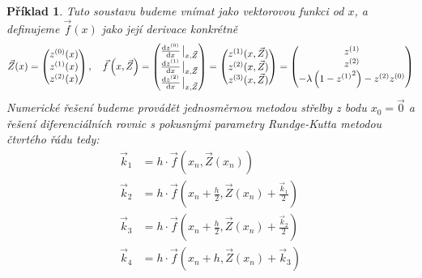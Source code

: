 \documentclass{article}
\newtheorem{example}{Příklad}
\begin{document}
\begin{example}
    Tuto soustavu budeme vnímat jako vektorovou funkci od $x$, a definujeme $\vec{f}(x)$ jako její derivace konkrétně 
    \begin{equation}
        \vec{Z}(x) = 
            \begin{pmatrix}
                z^{(0)}(x) \\ 
                z^{(1)}(x) \\
                z^{(2)}(x) \\
            \end{pmatrix} \qcomma 
        \vec{f}\left(x,\vec{Z}\right) = 
            \begin{pmatrix}
                \dv{z^{(0)}}{x}\eval_{x,\vec{Z}}\\
                \dv{z^{(1)}}{x}\eval_{x,\vec{Z}}\\
                \dv{z^{(2)}}{x}\eval_{x,\vec{Z}}\\
            \end{pmatrix}  =
            \begin{pmatrix} 
                z^{(1)}(x,\vec{Z}) \\
                z^{(2)}(x,\vec{Z}) \\
                z^{(3)}(x,\vec{Z}) \\
            \end{pmatrix} = 
            \begin{pmatrix} 
                z^{(1)} \\
                z^{(2)} \\
                -\lambda \left( 1 - {z^{(1)}}^{2} \right)  - z^{(2)}z^{(0)}
            \end{pmatrix} 
    \end{equation}
    Numerické řešení budeme provádět jednosměrnou metodou střelby z bodu $x_{0} = \vec{0}$ a řešení diferenciálních rovnic s pokusnými parametry Rundge-Kutta metodou čtvrtého řádu tedy:
    \begin{equation}
        \begin{aligned}
            \vec{k}_{1} &= h \cdot \vec{f}\left(  x_{n}, \vec{Z}(x_{n}) \right) \\ 
            \vec{k}_{2} &= h \cdot \vec{f}\left(  x_{n} + \frac{h}{2}, \vec{Z}(x_{n}) + \frac{\vec{k}_{1}}{2} \right) \\
            \vec{k}_{3} &= h \cdot \vec{f}\left( x_{n} + \frac{h}{2}, \vec{Z}(x_{n}) + \frac{\vec{k}_{2}}{2}  \right) \\
            \vec{k}_{4} &= h \cdot \vec{f}\left( x_{n} + h, \vec{Z}(x_{n}) + \vec{k}_{3}  \right)

\end{aligned}
\end{equation}
\end{example}
\end{document}
